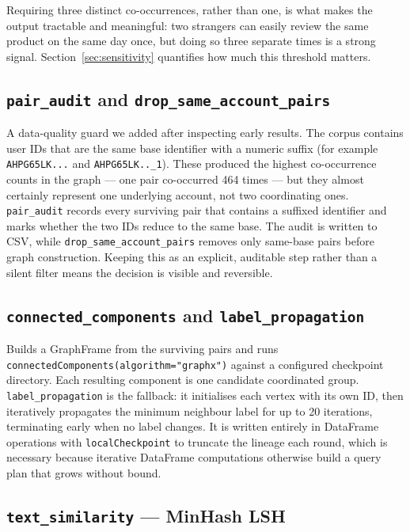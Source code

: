 \documentclass[12pt]{article}
\begin{document}
Requiring three distinct co-occurrences, rather than one, is what makes the
output tractable and meaningful: two strangers can easily review the same
product on the same day once, but doing so three separate times is a strong
signal. Section~\ref{sec:sensitivity} quantifies how much this threshold
matters.

\subsection{\texttt{pair\_audit} and \texttt{drop\_same\_account\_pairs}}

A data-quality guard we added after inspecting early results. The corpus
contains user IDs that are the same base identifier with a numeric suffix
(for example \texttt{AHPG65LK...} and \texttt{AHPG65LK..\_1}). These produced
the highest co-occurrence counts in the graph --- one pair co-occurred 464
times --- but they almost certainly represent one underlying account, not two
coordinating ones. \texttt{pair\_audit} records every surviving pair that
contains a suffixed identifier and marks whether the two IDs reduce to the
same base. The audit is written to CSV, while
\texttt{drop\_same\_account\_pairs} removes only same-base pairs before graph
construction.
Keeping this as an explicit, auditable step rather than a silent filter means
the decision is visible and reversible.

\subsection{\texttt{connected\_components} and \texttt{label\_propagation}}

Builds a GraphFrame from the surviving pairs and runs
\texttt{connectedComponents(algorithm="graphx")} against a configured
checkpoint directory. Each resulting component is one candidate coordinated
group. \texttt{label\_propagation} is the fallback: it initialises each vertex
with its own ID, then iteratively propagates the minimum neighbour label for
up to 20 iterations, terminating early when no label changes. It is written
entirely in DataFrame operations with \texttt{localCheckpoint} to truncate the
lineage each round, which is necessary because iterative DataFrame
computations otherwise build a query plan that grows without bound.

\subsection{\texttt{text\_similarity} --- MinHash LSH}
\end{document}
